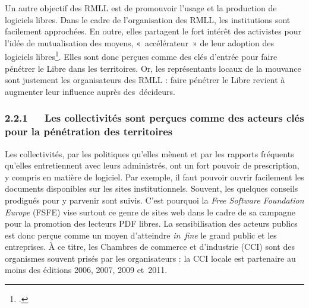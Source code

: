 \documentclass{FramateX}
\begin{document}
\begin{refsection}
Un autre objectif des RMLL est de promouvoir l'usage et la production de
logiciels libres. Dans le cadre de l'organisation des RMLL, les
institutions sont facilement approchées. En outre, elles partagent le
fort intérêt des activistes pour l'idée de mutualisation des moyens,
«~accélérateur~» de leur adoption des logiciels
libres\footnote{\cite{elieeconomie2009}.}. Elles sont donc perçues comme des clés d'entrée pour faire
pénétrer le Libre dans les territoires. Or, les représentants locaux de
la mouvance sont justement les organisateurs des RMLL : faire pénétrer
le Libre revient à augmenter leur influence auprès des~décideurs.

\subsubsection*{2.2.1~~~Les collectivités sont perçues comme des acteurs clés pour la pénétration des territoires}
{}

Les collectivités, par les politiques qu'elles mènent et par les
rapports fréquents qu'elles entretiennent avec leurs administrés, ont
un fort pouvoir de prescription, y compris en matière de logiciel. Par
exemple, il faut pouvoir ouvrir facilement les documents disponibles
sur les sites institutionnels. Souvent, les quelques conseils prodigués
pour y parvenir sont suivis. C'est pourquoi la \textit{Free Software
Foundation Europe} (FSFE) vise surtout ce genre de sites web dans le
cadre de sa campagne pour la promotion des lecteurs PDF libres. La
sensibilisation des acteurs publics est donc perçue comme un moyen
d'atteindre \textit{in~fine} le grand public et les entreprises. À ce
titre, les Chambres de commerce et d'industrie (CCI) sont des
organismes souvent prisés par les organisateurs : la CCI locale est
partenaire au moins des éditions 2006, 2007, 2009 et~2011.


\end{refsection}
\end{document}
